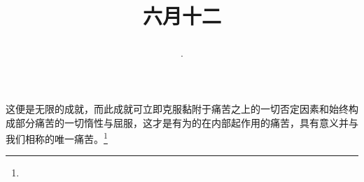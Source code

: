 \title{\date[d=17,m=7,y=2024][year:cn-y,年,month:cn,day:cn,日,·,weekday]·六月十二 }
这便是无限的成就，而此成就可立即克服黏附于痛苦之上的一切否定因素和始终构成部分痛苦的一切惰性与屈服，这才是有为的在内部起作用的痛苦，具有意义并与我们相称的唯一痛苦。\footnote{ }

